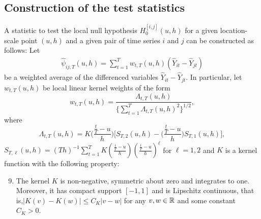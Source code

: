 \documentclass[a4paper,12pt]{article}
\makeatletter
\renewcommand{\eqref}[1]{\tagform@{\ref{#1}}}
\makeatother
\begin{document}


\subsection{Construction of the test statistics}\label{subsec:test:stat}


A statistic to test the local null hypothesis $H_0^{[i, j]}(u, h)$ for a given location-scale point $(u,h)$ and a given pair of time series $i$ and $j$ can be constructed as follows:
Let
\begin{align}\label{eq:psi_hat_ij}
\widehat{\psi}_{ij, T}(u, h) = \sum\limits_{t=1}^T w_{t,T}(u, h)(\widehat{Y}_{it} - \widehat{Y}_{jt})
\end{align}
be a weighted average of the differenced variables $\widehat{Y}_{it} - \widehat{Y}_{jt}$. In particular, let $w_{t,T}(u, h)$ be local linear kernel weights of the form
\begin{equation}\label{eq:weights}
w_{t,T}(u, h) = \frac{\Lambda_{t,T}(u, h)}{ \{\sum\nolimits_{t=1}^T \Lambda_{t,T}(u, h)^2 \}^{1/2} }, 
\end{equation}
where
\[ \Lambda_{t,T}(u, h) = K\Big(\frac{\frac{t}{T}-u}{h}\Big) \Big[ S_{T,2}(u, h) - \Big(\frac{\frac{t}{T}-u}{h}\Big) S_{T,1}(u, h) \Big], \]
$S_{T,\ell}(u, h) = (Th)^{-1} \sum\nolimits_{t=1}^T K(\frac{\frac{t}{T}-u}{h}) (\frac{\frac{t}{T}-u}{h})^\ell$ for $\ell = 1,2$ and $K$ is a kernel function with the following property: 
\begin{enumerate}[label=(C\arabic*),leftmargin=1.05cm]
\setcounter{enumi}{8}
\item \label{C-ker} The kernel $K$ is non-negative, symmetric about zero and integrates to one. Moreover, it has compact support $[-1,1]$ and is Lipschitz continuous, that is,\linebreak $|K(v) - K(w)| \le C_K |v-w|$ for any $v, w \in \mathbb{R}$ and some constant $C_K > 0$.
\end{enumerate} 
\end{document}
